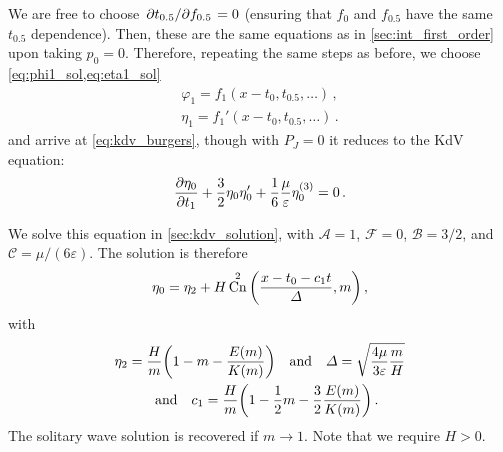 \documentclass{jfm}
\DeclareMathOperator{\cn}{Cn}
\renewcommand*{\epsilon}{\varepsilon}
\begin{document}
We are free to choose $\pdv*{t_{0.5}}{f_{0.5}} = 0$ (ensuring that $f_0$
and $f_{0.5}$ have the same $t_{0.5}$ dependence).
Then, these are the same equations as in \cref{sec:int_first_order} upon
taking $p_0=0$.
Therefore, repeating the same steps as before, we choose
\cref{eq:phi1_sol,eq:eta1_sol}
\begin{align}
  \varphi_1 = f_1(x-t_0,t_{0.5},\ldots) \,, \\
  \eta_1 = f_1'(x-t_0,t_{0.5},\ldots) \,.
\end{align}
and arrive at \cref{eq:kdv_burgers}, though with $P_J =0$ it reduces to
the KdV equation:
\begin{equation}
  \pdv{\eta_0}{t_1} + \frac{3}{2} \eta_0 \eta_0' + \frac{1}{6}
    \frac{\mu}{\epsilon} \eta_0^{(3)} = 0 \,.
\end{equation}

We solve this equation in \cref{sec:kdv_solution}, with $\mathcal{A} =
1$, $\mathcal{F} = 0$, $\mathcal{B} = 3/2$, and $\mathcal{C} = \mu/(6
\epsilon)$.
The solution is therefore
\begin{equation}
  \eta_0 = \eta_2 + H \cn^2\pqty{\frac{x-t_0-c_1 t}{\Delta} , m} \,,
\end{equation}
with
\begin{gather}
  \eta_2 = \frac{H}{m} \pqty{1 - m - \frac{E(m)}{K(m)}}
  \qq{and}
  \Delta = \sqrt{\frac{4 \mu}{3 \epsilon} \frac{m}{H}}
  \\
  \qq{and}
  c_1 = \frac{H}{m} \pqty{1 - \frac{1}{2} m - \frac{3}{2}
    \frac{E(m)}{K(m)}} \,.
\end{gather}
The solitary wave solution is recovered if $m \to 1$.
Note that we require $H > 0$.
\end{document}
